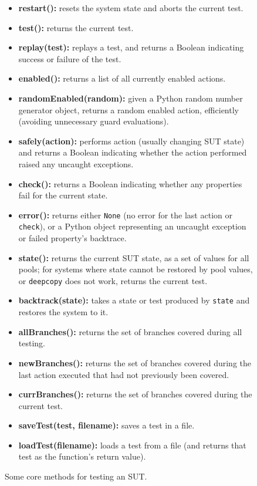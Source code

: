 \begin{figure}
{\scriptsize
\begin{itemize}
\item {\bf restart():}  resets the system state and aborts the current test. 
\item {\bf test():} returns the current test.
\item {\bf replay(test):} replays a test, and returns a Boolean indicating success or failure of the test.
\item {\bf enabled():} returns a list of all currently enabled actions.
\item {\bf randomEnabled(random):}  given a Python random number generator object, returns a random enabled action, efficiently (avoiding unnecessary guard evaluations).
\item {\bf safely(action):} performs action (usually changing SUT state)  and returns a Boolean indicating whether the action performed raised any uncaught exceptions. 
\item {\bf check():} returns a Boolean indicating whether any properties fail for the current state.
\item {\bf error():} returns either {\tt None} (no error for the last action or {\tt check}), or a Python object representing an uncaught exception or failed property's backtrace.
\item {\bf state():} returns the current SUT state, as a set of values for all pools; for systems where state cannot be restored by pool values, or {\tt deepcopy} does not work, returns the current test.
\item {\bf backtrack(state):} takes a state or test produced by {\tt state} and restores the system to it.
\item {\bf allBranches():} returns the set of branches covered during all testing.
\item {\bf newBranches():} returns the set of branches covered during the last action executed that had not previously been covered.
\item {\bf currBranches():} returns the set of branches covered during the current test.
\item {\bf saveTest(test, filename):} saves a test in a file.
\item {\bf loadTest(filename):} loads a test from a file (and returns that test as the function's return value).
\end{itemize} 
}
\caption{Some core methods for testing an SUT.}
\label{methods}
\end{figure}

